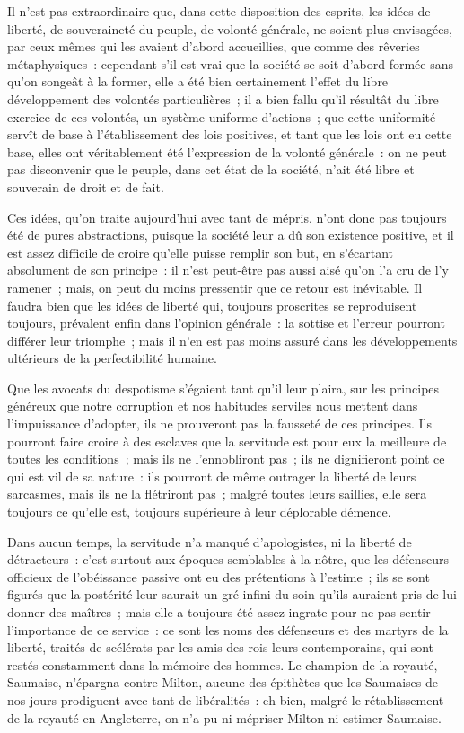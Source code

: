 \documentclass[french,twoside]{book} %
\newcommand\chapterclose{} %
\begin{document}
Il n’est pas extraordinaire que, dans cette disposition des esprits, les idées de liberté, de souveraineté du peuple, de volonté générale, ne soient plus envisagées, par ceux mêmes qui les avaient d’abord accueillies, que comme des rêveries métaphysiques : cependant s’il est vrai que la société se soit d’abord formée sans qu’on songeât à la former, elle a été bien certainement l’effet du libre développement des volontés particulières ; il a bien fallu qu’il résultât du libre exercice de ces volontés, un système uniforme d’actions ; que cette uniformité servît de base à l’établissement des lois positives, et tant que les lois ont eu cette base, elles ont véritablement été l’expression de la volonté générale : on ne peut pas disconvenir que le peuple, dans cet état de la société, n’ait été libre et souverain de droit et de fait.\par
Ces idées, qu’on traite aujourd’hui avec tant de mépris, n’ont donc pas toujours été de pures abstractions, puisque la société leur a dû son existence positive, et il est assez difficile de croire qu’elle puisse remplir son but, en s’écartant absolument de son principe : il n’est peut-être pas aussi aisé qu’on l’a cru de l’y ramener ; mais, on peut du moins pressentir que ce retour est inévitable. Il faudra bien que les idées de liberté qui, toujours proscrites se reproduisent toujours, prévalent enfin dans l’opinion générale : la sottise et l’erreur pourront différer leur triomphe ; mais il n’en est pas moins assuré dans les développements ultérieurs de la perfectibilité humaine.\par
Que les avocats du despotisme s’égaient tant qu’il leur plaira, sur les principes généreux que notre corruption et nos habitudes serviles nous mettent dans l’impuissance d’adopter, ils ne prouveront pas la fausseté de ces principes. Ils pourront faire croire à des esclaves que la servitude est pour eux la meilleure de toutes les conditions ; mais ils ne l’ennobliront pas ; ils ne dignifieront point ce qui est vil de sa nature : ils pourront de même outrager la liberté de leurs sarcasmes, mais ils ne la flétriront pas ; malgré toutes leurs saillies, elle sera toujours ce qu’elle est, toujours supérieure à leur déplorable démence.\par
Dans aucun temps, la servitude n’a manqué d’apologistes, ni la liberté de détracteurs : c’est surtout aux époques semblables à la nôtre, que les défenseurs officieux de l’obéissance passive ont eu des prétentions à l’estime ; ils se sont figurés que la postérité leur saurait un gré infini du soin qu’ils auraient pris de lui donner des maîtres ; mais elle a toujours été assez ingrate pour ne pas sentir l’importance de ce service : ce sont les noms des défenseurs et des martyrs de la liberté, traités de scélérats par les amis des rois leurs contemporains, qui sont restés constamment dans la mémoire des hommes. Le champion de la royauté, Saumaise, n’épargna contre Milton, aucune des épithètes que les Saumaises de nos jours prodiguent avec tant de libéralités : eh bien, malgré le rétablissement de la royauté en Angleterre, on n’a pu ni mépriser Milton ni estimer Saumaise.
\chapterclose
\end{document}
